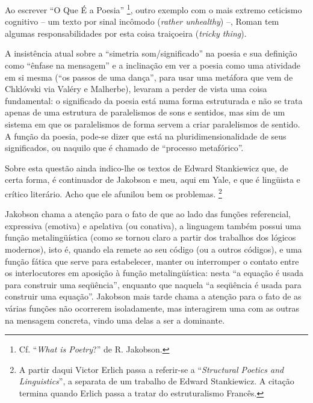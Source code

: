 Ao escrever ``O Que É a Poesia'' \footnote{Cf. ``\emph{What is
  Poetry}?'' de R. Jakobson.}, outro exemplo com o mais extremo
ceticismo cognitivo -- um texto por sinal incômodo (\emph{rather
unhealthy}) --, Roman tem algumas responsabilidades por esta coisa
traiçoeira (\emph{tricky thing}).

A insistência atual sobre a ``simetria som/significado'' na poesia e sua
definição como ``ênfase na mensagem'' e a inclinação em ver a poesia
como uma atividade em si mesma (``os passos de uma dança'', para usar
uma metáfora que vem de Chklóvski via Valéry e Malherbe), levaram a
perder de vista uma coisa fundamental: o significado da poesia está numa
forma estruturada e não se trata apenas de uma estrutura de paralelismos
de sons e sentidos, mas sim de um sistema em que os paralelismos de
forma servem a criar paralelismos de sentido. A função da poesia,
pode-se dizer que está na pluridimensionalidade de seus significados, ou
naquilo que é chamado de ``processo metafórico''.

Sobre esta questão ainda indico-lhe os textos de Edward Stankiewicz que,
de certa forma, é continuador de Jakobson e meu, aqui em Yale, e que é
lingüista e crítico literário. Acho que ele afunilou bem os problemas.
\footnote{A partir daqui Victor Erlich passa a referir-se a
  ``\emph{Structural Poetics and Linguistics}'', a separata de um
  trabalho de Edward Stankiewicz. A citação termina quando Erlich passa
  a tratar do estruturalismo Francês.}

Jakobson chama a atenção para o fato de que ao lado das funções
referencial, expressiva (emotiva) e apelativa (ou conativa), a linguagem
também possui uma função metalingüística (como se tornou claro a partir
dos trabalhos dos lógicos modernos), isto é, quando ela remete ao seu
código (ou a outros códigos), e uma função fática que serve para
estabelecer, manter ou interromper o contato entre os interlocutores em
aposição à função metalingüística: nesta ``a equação é usada para
construir uma seqüência'', enquanto que naquela ``a seqüência é usada
para construir uma equação''. Jakobson mais tarde chama a atenção para o
fato de as várias funções não ocorrerem isoladamente, mas interagirem
uma com as outras na mensagem concreta, vindo uma delas a ser a
dominante.

